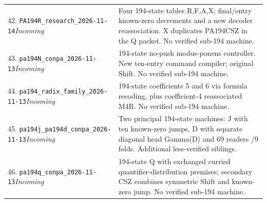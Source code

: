 \begin{longtable}{@{}p{.37\linewidth}p{.59\linewidth}@{}}
42. \nolinkurl{PA194R_research_2026-11-14}\newline\emph{Incoming} & Four 194-state tables R,F,A,X: final/entry known-zero decrements and a new decoder reassociation. X duplicates PA194CSZ in the Q packet. No verified sub-194 machine.\\[4pt]
43. \nolinkurl{pa194N_conpa_2026-11-13}\newline\emph{Incoming} & 194-state no-push modus-ponens controller. New ten-entry command compiler; original Shift. No verified sub-194 machine.\\[4pt]
44. \nolinkurl{pa194_radix_family_2026-11-13}\newline\emph{Incoming} & 194-state coefficients 5 and 6 via formula recoding, plus coefficient-4 reassociated M4R. No verified sub-194 machine.\\[4pt]
45. \nolinkurl{pa194j_pa194d_conpa_2026-11-13}\newline\emph{Incoming} & Two principal 194-state machines: J with ten known-zero jumps, D with separate diagonal head Gamma(D) and 69 readers /9 folds. Additional less-verified siblings.\\[4pt]
46. \nolinkurl{pa194q_conpa_2026-11-13}\newline\emph{Incoming} & 194-state Q with exchanged curried quantifier-distribution premises; secondary CSZ combines symmetric Shift and known-zero jump. No verified sub-194 machine.\\[4pt]
\bottomrule\end{longtable}\endgroup
